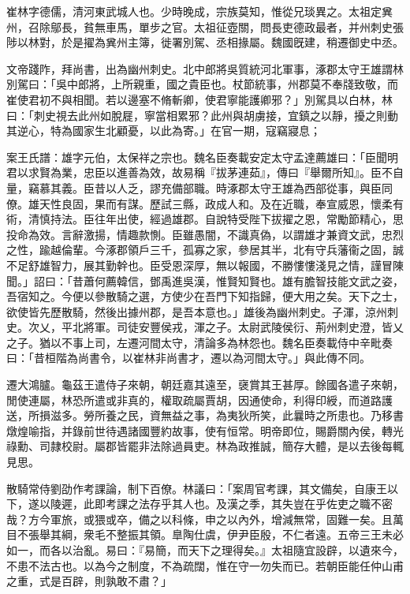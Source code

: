 
\begin{pinyinscope}
崔林字德儒，清河東武城人也。少時晚成，宗族莫知，惟從兄琰異之。太祖定兾州，召除鄔長，貧無車馬，單步之官。太祖征壺關，問長吏德政最者，并州刺史張陟以林對，於是擢為兾州主簿，徙署別駕、丞相掾屬。魏國旣建，稍遷御史中丞。

文帝踐阼，拜尚書，出為幽州刺史。北中郎將吳質統河北軍事，涿郡太守王雄謂林別駕曰：「吳中郎將，上所親重，國之貴臣也。杖節統事，州郡莫不奉牋致敬，而崔使君初不與相聞。若以邊塞不脩斬卿，使君寧能護卿邪？」別駕具以白林，林曰：「刺史視去此州如脫屣，寧當相累邪？此州與胡虜接，宜鎮之以靜，擾之則動其逆心，特為國家生北顧憂，以此為寄。」在官一期，寇竊寢息；

案王氏譜：雄字元伯，太保祥之宗也。魏名臣奏載安定太守孟達薦雄曰：「臣聞明君以求賢為業，忠臣以進善為效，故易稱『拔茅連茹』，傳曰『舉爾所知』。臣不自量，竊慕其義。臣昔以人乏，謬充備部職。時涿郡太守王雄為西部從事，與臣同僚。雄天性良固，果而有謀。歷試三縣，政成人和。及在近職，奉宣威恩，懷柔有術，清慎持法。臣往年出使，經過雄郡。自說特受陛下拔擢之恩，常勵節精心，思投命為效。言辭激揚，情趣款惻。臣雖愚闇，不識真偽，以謂雄才兼資文武，忠烈之性，踰越倫輩。今涿郡領戶三千，孤寡之家，參居其半，北有守兵藩衞之固，誠不足舒雄智力，展其勤幹也。臣受恩深厚，無以報國，不勝慺慺淺見之情，謹冒陳聞。」詔曰：「昔蕭何薦韓信，鄧禹進吳漢，惟賢知賢也。雄有膽智技能文武之姿，吾宿知之。今便以參散騎之選，方使少在吾門下知指歸，便大用之矣。天下之士，欲使皆先歷散騎，然後出據州郡，是吾本意也。」雄後為幽州刺史。子渾，涼州刺史。次乂，平北將軍。司徒安豐侯戎，渾之子。太尉武陵侯衍、荊州刺史澄，皆乂之子。猶以不事上司，左遷河間太守，清論多為林怨也。魏名臣奏載侍中辛毗奏曰：「昔桓階為尚書令，以崔林非尚書才，遷以為河間太守。」與此傳不同。

遷大鴻臚。龜茲王遣侍子來朝，朝廷嘉其遠至，襃賞其王甚厚。餘國各遣子來朝，閒使連屬，林恐所遣或非真的，權取疏屬賈胡，因通使命，利得印綬，而道路護送，所損滋多。勞所養之民，資無益之事，為夷狄所笑，此曩時之所患也。乃移書燉煌喻指，并錄前世待遇諸國豐約故事，使有恒常。明帝即位，賜爵關內侯，轉光祿勳、司隷校尉。屬郡皆罷非法除過員吏。林為政推誠，簡存大體，是以去後每輒見思。

散騎常侍劉劭作考課論，制下百僚。林議曰：「案周官考課，其文備矣，自康王以下，遂以陵遲，此即考課之法存乎其人也。及漢之季，其失豈在乎佐吏之職不密哉？方今軍旅，或猥或卒，備之以科條，申之以內外，增減無常，固難一矣。且萬目不張舉其綱，衆毛不整振其領。臯陶仕虞，伊尹臣殷，不仁者遠。五帝三王未必如一，而各以治亂。易曰：『易簡，而天下之理得矣。』太祖隨宜設辟，以遺來今，不患不法古也。以為今之制度，不為疏闊，惟在守一勿失而已。若朝臣能任仲山甫之重，式是百辟，則孰敢不肅？」


\end{pinyinscope}
